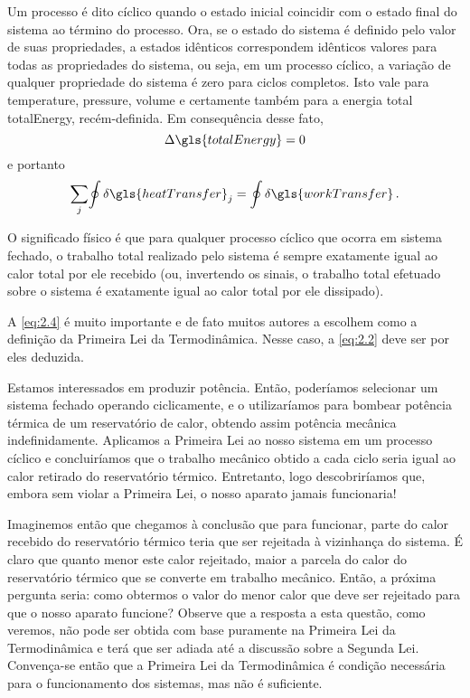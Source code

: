     Um processo é dito cíclico quando o estado inicial coincidir com o estado
    final do sistema ao término do processo. Ora, se o estado do sistema é
    definido pelo valor de suas propriedades, a estados idênticos correspondem
    idênticos valores para todas as propriedades do sistema, ou seja, em um
    processo cíclico, a variação de qualquer propriedade do sistema é zero para
    ciclos completos. Isto vale para \gls{temperature}, \gls{pressure},
    \gls{volume} e certamente também para a energia total \gls{totalEnergy},
    recém-definida. Em consequência desse fato,
    \begin{equation}
        \Delta{\gls{totalEnergy}}
        =
        0
    \end{equation}
    e portanto
    \begin{equation} \label{eq:2.4}
        \underset{j}{\sum }{
            \oint{
                \idiff{\gls{heatTransfer}}_j
            }
        }
        =
        \oint{%
            \idiff{\gls{workTransfer}}
        }\,.
    \end{equation}

    O significado físico é que para qualquer processo cíclico que ocorra em
    sistema fechado, o trabalho total realizado pelo sistema é sempre
    exatamente igual ao calor total por ele recebido (ou, invertendo os sinais,
    o trabalho total efetuado sobre o sistema é exatamente igual ao calor total
    por ele dissipado).

    A \cref{eq:2.4} é muito importante e de fato muitos autores a escolhem como
    a definição da Primeira Lei da Termodinâmica. Nesse caso, a \cref{eq:2.2}
    deve ser por eles deduzida.

    Estamos interessados em produzir potência. Então, poderíamos selecionar um
    sistema fechado operando ciclicamente, e o utilizaríamos para bombear
    potência térmica de um reservatório de calor, obtendo assim potência
    mecânica indefinidamente. Aplicamos a Primeira Lei ao nosso sistema em um
    processo cíclico e concluiríamos que o trabalho mecânico obtido a cada
    ciclo seria igual ao calor retirado do reservatório térmico. Entretanto,
    logo descobriríamos que, embora sem violar a Primeira Lei, o nosso aparato
    jamais funcionaria!

    Imaginemos então que chegamos à conclusão que para funcionar, parte do
    calor recebido do reservatório térmico teria que ser rejeitada à
    vizinhança do sistema. É claro que quanto menor este calor rejeitado, maior
    a parcela do calor do reservatório térmico que se converte em trabalho
    mecânico. Então, a próxima pergunta seria: como obtermos o valor do menor
    calor que deve ser rejeitado para que o nosso aparato funcione? Observe que
    a resposta a esta questão, como veremos, não pode ser obtida com base
    puramente na Primeira Lei da Termodinâmica e terá que ser adiada até a
    discussão sobre a Segunda Lei. Convença-se então que a Primeira Lei da
    Termodinâmica é condição necessária para o funcionamento dos sistemas, mas
    não é suficiente.

